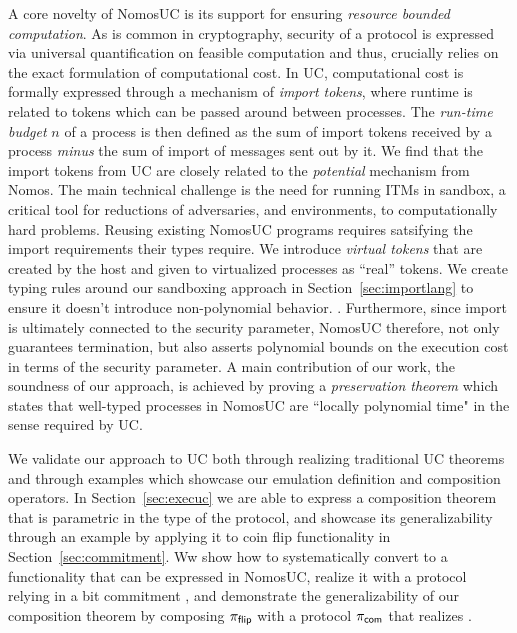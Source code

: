 A core novelty of NomosUC is its support for ensuring \emph{resource bounded computation}.
As is common in cryptography, security of a protocol is expressed via universal quantification
on feasible computation and thus, crucially relies on the exact formulation of computational cost.
In UC, computational cost is formally expressed through a mechanism of \emph{import tokens}, where runtime is related to tokens which can be passed around between processes.
The \emph{run-time budget} $n$ of a process is then defined as the sum of import tokens received by a process \emph{minus} the sum of import of messages sent out by it.
We find that the import tokens from UC are closely related to the \emph{potential} mechanism from Nomos.
The main technical challenge is the need for running ITMs in sandbox, a critical tool for reductions of adversaries, and environments, to computationally hard problems.
Reusing existing NomosUC programs requires satsifying the import requirements their types require.
We introduce \emph{virtual tokens} that are created by the host and given to virtualized processes as ``real'' tokens. 
We create typing rules around our sandboxing approach in Section~\ref{sec:importlang} to ensure it doesn't introduce non-polynomial behavior.
.
Furthermore, since import is ultimately connected to the security parameter, NomosUC
therefore, not only guarantees termination, but also asserts polynomial bounds on
the execution cost in terms of the security parameter.
A main contribution of our work, the soundness of our approach, is achieved by proving a \emph{preservation theorem}
which states that well-typed processes in NomosUC are ``locally polynomial time"
in the sense required by UC.

We validate our approach to UC both through realizing traditional UC theorems and through examples which showcase our emulation definition and composition operators.
In Section~\ref{sec:execuc} we are able to express a composition theorem that is parametric in the type of the protocol, and showcase its generalizability through an example 
by applying it to coin flip functionality \Fflip in Section~\ref{sec:commitment}.
Ww show how to systematically convert \Fflip to a functionality that can be expressed in NomosUC, realize it with a protocol relying in a bit commitment \Fcom, and demonstrate the generalizability of our composition theorem by composing $\pi_{\mathsf{flip}}$ with a protocol $\pi_{\mathsf{com}}$ that realizes \Fcom.  

